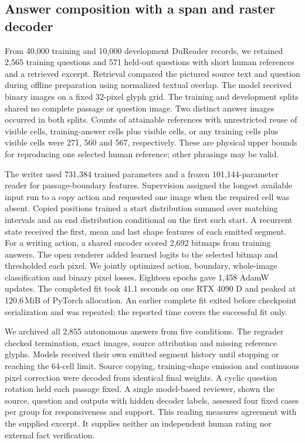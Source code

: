 \subsection*{Answer composition with a span and raster decoder}
From 40,000 training and 10,000 development DuReader records, we retained 2,565 training questions and 571 held-out questions with short human references and a retrieved excerpt. Retrieval compared the pictured source text and question during offline preparation using normalized textual overlap. The model received binary images on a fixed 32-pixel glyph grid. The training and development splits shared no complete passage or question image. Two distinct answer images occurred in both splits. Counts of attainable references with unrestricted reuse of visible cells, training-answer cells plus visible cells, or any training cells plus visible cells were 271, 560 and 567, respectively. These are physical upper bounds for reproducing one selected human reference; other phrasings may be valid.

The writer used 731,384 trained parameters and a frozen 101,144-parameter reader for passage-boundary features. Supervision assigned the longest available input run to a copy action and requested one image when the required cell was absent. Copied positions trained a start distribution summed over matching intervals and an end distribution conditional on the first such start. A recurrent state received the first, mean and last shape features of each emitted segment. For a writing action, a shared encoder scored 2,692 bitmaps from training answers. The open renderer added learned logits to the selected bitmap and thresholded each pixel. We jointly optimized action, boundary, whole-image classification and binary pixel losses. Eighteen epochs gave 1,458 AdamW updates. The completed fit took 41.1 seconds on one RTX 4090 D and peaked at 120.6\,MiB of PyTorch allocation. An earlier complete fit exited before checkpoint serialization and was repeated; the reported time covers the successful fit only.

We archived all 2,855 autonomous answers from five conditions. The regrader checked termination, exact images, source attribution and missing reference glyphs. Models received their own emitted segment history until stopping or reaching the 64-cell limit. Source copying, training-shape emission and continuous pixel correction were decoded from identical final weights. A cyclic question rotation held each passage fixed. A single model-based reviewer, shown the source, question and outputs with hidden decoder labels, assessed four fixed cases per group for responsiveness and support. This reading measures agreement with the supplied excerpt. It supplies neither an independent human rating nor external fact verification.
